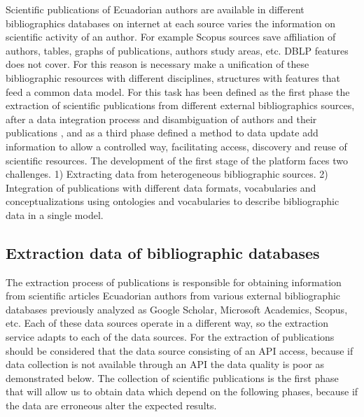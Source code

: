 \documentclass[11pt]{article}
\begin{document}
Scientific publications of Ecuadorian authors are available in different bibliographics databases on internet at each source varies the information on scientific activity of an author. For example Scopus sources  save affiliation of authors, tables, graphs of publications, authors study areas, etc. DBLP features does not cover. For this reason is necessary make a unification of these bibliographic resources with different disciplines, structures with features that feed a common data model. For this task has been defined as the first phase the extraction of scientific publications from different external bibliographics sources, after a data integration process and disambiguation of authors and their publications , and as a third phase defined a method to  data update add information to allow a controlled way, facilitating access, discovery and reuse of scientific resources.
The development of the first stage of the platform faces two challenges. 1) Extracting data from heterogeneous bibliographic sources. 2) Integration of publications with different data formats, vocabularies and conceptualizations using ontologies and vocabularies to describe bibliographic data in a single model.


\subsection{Extraction data of bibliographic databases}
The extraction process of publications is responsible for obtaining information from scientific articles Ecuadorian authors from various external bibliographic databases previously analyzed as Google Scholar, Microsoft Academics, Scopus, etc. Each of these data sources operate in a different way, so the extraction service adapts to each of the data sources. For the extraction of publications should be considered that the data source consisting of an API access, because if data collection is not available through an API the data quality is poor as demonstrated below. The collection of scientific publications is the first phase that will allow us to obtain data which depend on the following phases, because if the data are erroneous alter the expected results.
\end{document}
